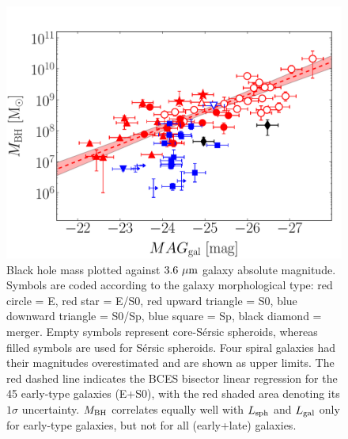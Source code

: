 \documentclass[preprint2]{emulateapj}
\begin{document}
\begin{figure}[h]
\begin{center}
\includegraphics[width=\columnwidth]{images/mbh_vs_mag_tot.pdf}
\caption{Black hole mass plotted against $3.6\rm~\mu m$ galaxy absolute magnitude. 
Symbols are coded according to the galaxy morphological type: red circle = E, red star = E/S0, 
red upward triangle = S0, blue downward triangle = S0/Sp, blue square = Sp, black diamond = merger. 
Empty symbols represent core-S\'ersic spheroids, whereas filled symbols are used for S\'ersic spheroids. 
Four spiral galaxies had their magnitudes overestimated and are shown as upper limits. 
The red dashed line indicates the BCES bisector linear regression for the 45 early-type galaxies (E+S0), 
with the red shaded area denoting its $1\sigma$ uncertainty. 
$M_{\rm BH}$ correlates equally well with $L_{\rm sph}$ and $L_{\rm gal}$ only for early-type galaxies, 
but not for all (early+late) galaxies. }
\label{fig:mbhmaggal}
\end{center}
\end{figure}
\end{document}
